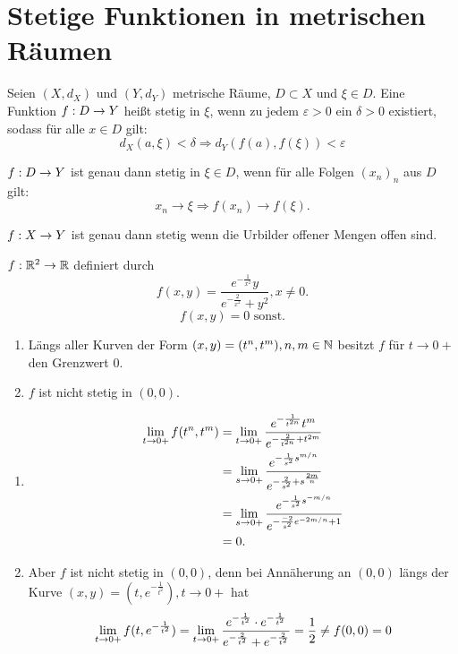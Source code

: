 \documentclass[../ana2u.tex]{subfiles}
\begin{document}
\setcounter{section}{7}
\section{Stetige Funktionen in metrischen Räumen}
Seien \( (X, d_X) \) und \( (Y, d_Y) \) 
metrische Räume, \( D \subset X \) und 
\( \xi \in D \).
Eine Funktion \( f:D\rightarrow Y \) heißt stetig in \(\xi\),
wenn zu jedem \(\varepsilon > 0\) ein \(\delta > 0\) 
existiert, sodass für alle \(x \in D\) gilt:
\[ d_X(a, \xi) < \delta 
\Rightarrow d_Y(f(a), f(\xi)) < \varepsilon \]

\begin{defi}
    \( f:D\rightarrow Y \) ist genau dann stetig 
    in \( \xi \in D \), wenn für alle 
    Folgen \( (x_n)_n \) aus \(D\) gilt:
    \[ x_n \rightarrow \xi \Rightarrow 
    f(x_n) \rightarrow f(\xi). \]
\end{defi}
\begin{bem}
    \( f:X\rightarrow Y \) ist genau dann stetig wenn die 
    Urbilder offener Mengen offen sind.
\end{bem}
\begin{bsp}
    \( f:\mathbb{R}^2\rightarrow \mathbb{R} \) definiert durch 
    \[ f(x,y) 
    = \frac{e^{-\frac{1}{x^2}}y}{e^{-\frac{2}{x^2}}+y^2}, x \neq 0. \]
    \[ f(x,y) = 0 \text{ sonst.} \]
\end{bsp}
\begin{beh}
    \begin{enumerate}
        \item Längs aller Kurven der Form 
        \( (x,y) = (t^n, t^m), n,m\in\mathbb{N} \) besitzt 
        \( f \) für \( t \rightarrow 0+ \) den 
        Grenzwert \( 0 \).
        \item \( f \) ist nicht stetig in \( (0,0) \).
    \end{enumerate}
\end{beh}
\begin{bew}
    \begin{enumerate}
        \item 
        \begin{align*}
            \lim\limits_{t\rightarrow{}0+} f(t^n, t^m) 
            &= \lim\limits_{t\rightarrow{}0+} \frac{ e^{-\frac{1}{t^{2n}}} t^m }{ e^{-\frac{2}{t^{2n}} + t^{2m} } }\\
            &= \lim\limits_{s\rightarrow{}0+} \frac{ e^{-\frac{1}{s^2} s^{m/n} } }{ e^{ -\frac{2}{s^2} + s^{\frac{2m}{n}} } }\\
            &= \lim\limits_{s\rightarrow{}0+} \frac{ e^{-\frac{1}{s^2} s^{-m/n} } }{ e^{ -\frac{-2}{s^2} e^{-2m/n} + 1 } }\\
            &= 0.
        \end{align*}
        \item Aber \(f\) ist nicht stetig in \((0,0)\), denn
        bei Annäherung an \((0,0)\) längs der Kurve
        \( (x, y) = (t, e^{-\frac{1}{t^2}}), t \rightarrow 0+ \)
        hat 
        \[ \lim\limits_{t\rightarrow{}0+} f(t, e^{-\frac{1}{t^2}}) 
        = \lim\limits_{t\rightarrow{}0+} \frac{e^{-\frac{1}{t^2}} 
        \cdot e^{-\frac{1}{t^2}}}{e^{-\frac{2}{t^2}} + e^{-\frac{2}{t^2}}}
        = \frac{1}{2} \neq f(0,0) = 0 \]
    \end{enumerate}
\end{bew}
\end{document}
